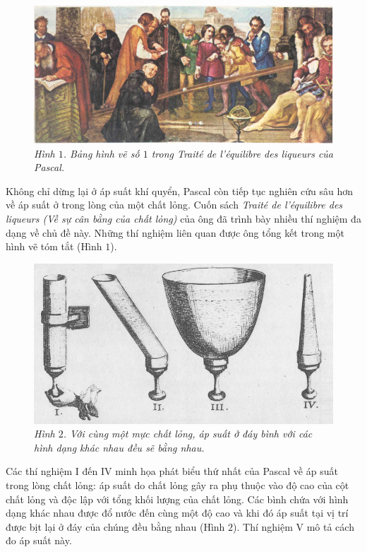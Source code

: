 \begin{multicols}{2}
\begin{figure}[H]
		\includegraphics[width= 1\linewidth]{2}
		\caption{\small\textit{\color{timhieukhoahoc}Hình $1$. Bảng hình vẽ số $1$ trong Traité de l'équilibre des liqueurs của Pascal.}}
		\vspace*{-5pt}
	\end{figure}
	Không chỉ dừng lại ở áp suất khí quyển, Pascal còn tiếp tục nghiên cứu sâu hơn về áp suất ở trong lòng của một chất lỏng. Cuốn sách \textit{Traité de l'équilibre des liqueurs (Về sự cân bằng của chất lỏng)} của ông đã trình bày nhiều thí nghiệm đa dạng về chủ đề này. Những thí nghiệm liên quan được ông tổng kết trong một hình vẽ tóm tắt (Hình $1$).
	\begin{figure}[H]
		\vspace*{-5pt}
		\centering
		\captionsetup{labelformat= empty, justification=centering}
		\includegraphics[width= 0.95\linewidth]{3}
		\caption{\small\textit{\color{timhieukhoahoc}Hình $2$. Với cùng một mực chất lỏng, áp suất ở đáy bình với các hình dạng khác nhau đều sẽ bằng nhau.}}
		\vspace*{-10pt}
	\end{figure}
	Các thí nghiệm I đến IV minh họa phát biểu thứ nhất của Pascal về áp suất trong lòng chất lỏng: áp suất do chất lỏng gây ra phụ thuộc vào độ cao của cột chất lỏng và độc lập với tổng khối lượng của chất lỏng. Các bình chứa với hình dạng khác nhau được đổ nước đến cùng một độ cao và khi đó áp suất tại vị trí được bịt lại ở đáy của chúng đều bằng nhau (Hình $2$). Thí nghiệm V mô tả cách đo áp suất này.

\end{multicols}
